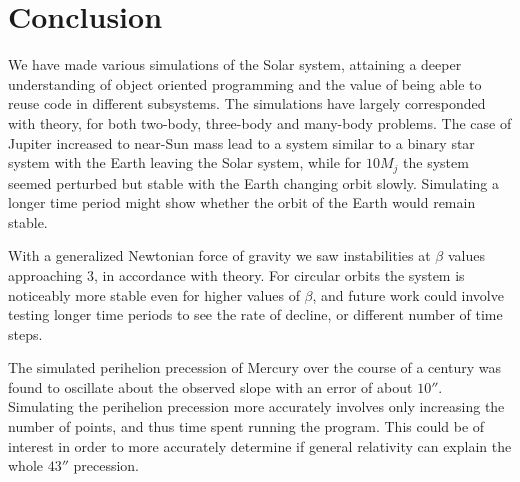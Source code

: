 \documentclass[../main.tex]{subfiles}
\begin{document}
\section{Conclusion}\label{sec:conclusion}

We have made various simulations of the Solar system, attaining a deeper understanding of object oriented programming and the value of being able to reuse code in different subsystems. The simulations have largely corresponded with theory, for both two-body, three-body and many-body problems. The case of Jupiter increased to near-Sun mass lead to a system similar to a binary star system with the Earth leaving the Solar system, while for $10M_j$ the system seemed perturbed but stable with the Earth changing orbit slowly. Simulating a longer time period might show whether the orbit of the Earth would remain stable.

With a generalized Newtonian force of gravity we saw instabilities at $\beta$ values approaching $3$, in accordance with theory. For circular orbits the system is noticeably more stable even for higher values of $\beta$, and future work could involve testing longer time periods to see the rate of decline, or different number of time steps.

The simulated perihelion precession of Mercury over the course of a century was found to oscillate about the observed slope with an error of about $10''$. Simulating the perihelion precession more accurately involves only increasing the number of points, and thus time spent running the program. This could be of interest in order to more accurately determine if general relativity can explain the whole $43''$ precession.
\end{document}
